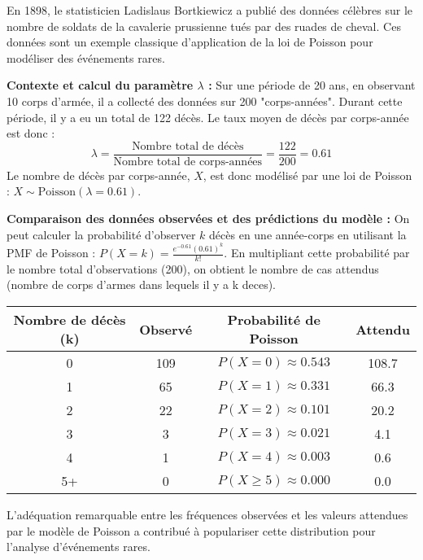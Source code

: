 \begin{examplebox}
En 1898, le statisticien Ladislaus Bortkiewicz a publié des données célèbres sur le nombre de soldats de la cavalerie prussienne tués par des ruades de cheval. Ces données sont un exemple classique d'application de la loi de Poisson pour modéliser des événements rares.

\noindent\textbf{Contexte et calcul du paramètre $\lambda$ :}
Sur une période de 20 ans, en observant 10 corps d'armée, il a collecté des données sur 200 "corps-années". Durant cette période, il y a eu un total de 122 décès. Le taux moyen de décès par corps-année est donc :
$$ \lambda = \frac{\text{Nombre total de décès}}{\text{Nombre total de corps-années}} = \frac{122}{200} = 0.61 $$
Le nombre de décès par corps-année, $X$, est donc modélisé par une loi de Poisson : $X \sim \text{Poisson}(\lambda=0.61)$.

\noindent\textbf{Comparaison des données observées et des prédictions du modèle :}
On peut calculer la probabilité d'observer $k$ décès en une année-corps en utilisant la PMF de Poisson : $P(X=k) = \frac{e^{-0.61} (0.61)^k}{k!}$. En multipliant cette probabilité par le nombre total d'observations (200), on obtient le nombre de cas attendus (nombre de corps d'armes dans lequels il y a k deces).

\begin{center}
\begin{tabular}{|c|c|c|c|}
\hline
\textbf{Nombre de décès (k)} & \textbf{Observé} & \textbf{Probabilité de Poisson} & \textbf{Attendu} \\
\hline
0 & 109 & $P(X=0) \approx 0.543$ & 108.7 \\
1 & 65 & $P(X=1) \approx 0.331$ & 66.3 \\
2 & 22 & $P(X=2) \approx 0.101$ & 20.2 \\
3 & 3 & $P(X=3) \approx 0.021$ & 4.1 \\
4 & 1 & $P(X=4) \approx 0.003$ & 0.6 \\
5+ & 0 & $P(X \ge 5) \approx 0.000$ & 0.0 \\
\hline
\end{tabular}
\end{center}

L'adéquation remarquable entre les fréquences observées et les valeurs attendues par le modèle de Poisson a contribué à populariser cette distribution pour l'analyse d'événements rares.
\end{examplebox}

